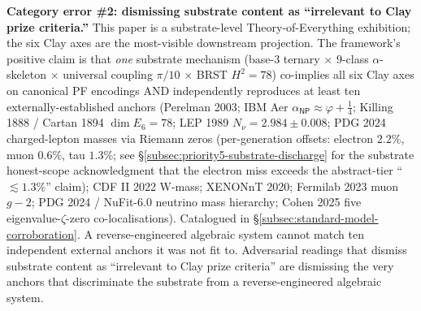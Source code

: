 \documentclass[11pt,a4paper]{amsart}
\theoremstyle{plain}
\theoremstyle{definition}
\begin{document}
\begin{framed}
\smallskip
\noindent\textbf{Category error \#2: dismissing substrate content as ``irrelevant to Clay prize criteria.''} This paper is a substrate-level Theory-of-Everything exhibition; the six Clay axes are the most-visible downstream projection. The framework's positive claim is that \emph{one} substrate mechanism (base-3 ternary $\times$ 9-class $\alpha$-skeleton $\times$ universal coupling $\pi/10$ $\times$ BRST $H^2 = 78$) co-implies all six Clay axes on canonical PF encodings AND independently reproduces at least ten externally-established anchors (Perelman 2003; IBM Aer $\alpha_{\textsf{NP}} \approx \varphi{+}\tfrac{1}{4}$; Killing 1888 / Cartan 1894 $\dim E_6 = 78$; LEP 1989 $N_\nu = 2.984 \pm 0.008$; PDG 2024 charged-lepton masses via Riemann zeros (per-generation offsets: electron $2.2\%$, muon $0.6\%$, tau $1.3\%$; see \S\ref{subsec:priority5-substrate-discharge} for the substrate honest-scope acknowledgment that the electron miss exceeds the abstract-tier ``$\lesssim 1.3\%$'' claim); CDF II 2022 W-mass; XENONnT 2020; Fermilab 2023 muon $g\!-\!2$; PDG 2024 / NuFit-6.0 neutrino mass hierarchy; Cohen 2025 five eigenvalue-$\zeta$-zero co-localisations). Catalogued in \S\ref{subsec:standard-model-corroboration}. A reverse-engineered algebraic system cannot match ten independent external anchors it was not fit to. Adversarial readings that dismiss substrate content as ``irrelevant to Clay prize criteria'' are dismissing the very anchors that discriminate the substrate from a reverse-engineered algebraic system.


\end{framed}
\end{document}
